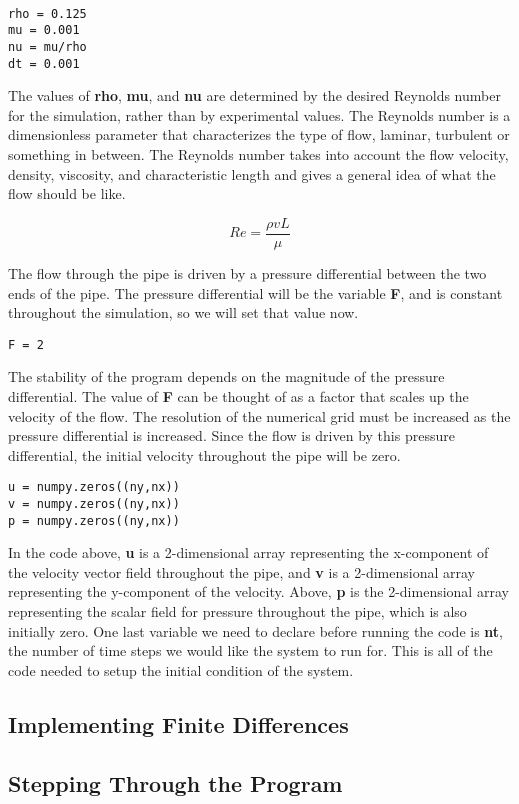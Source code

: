 \documentclass[twocolumn,12pth]{article}
\begin{document}
\begin{lstlisting}

rho = 0.125
mu = 0.001
nu = mu/rho
dt = 0.001

\end{lstlisting}

The values of \textbf{rho}, \textbf{mu}, and \textbf{nu} are determined by the desired Reynolds number for the simulation, rather than by experimental values.
The Reynolds number is a dimensionless parameter that characterizes the type of flow, laminar, turbulent or something in between.
The Reynolds number takes into account the flow velocity, density, viscosity, and characteristic length and gives a general idea of what the flow should be like.

\begin{equation}
Re = \frac{\rho{v}{L}}{\mu}
\end{equation}

The flow through the pipe is driven by a pressure differential between the two ends of the pipe.
The pressure differential will be the variable \textbf{F}, and is constant throughout the simulation, so we will set that value now.

\begin{lstlisting}
F = 2
\end{lstlisting}

The stability of the program depends on the magnitude of the pressure differential.
The value of \textbf{F} can be thought of as a factor that scales up the velocity of the flow.
The resolution of the numerical grid must be increased as the pressure differential is increased.
Since the flow is driven by this pressure differential, the initial velocity throughout the pipe will be zero.

\begin{lstlisting}
u = numpy.zeros((ny,nx))
v = numpy.zeros((ny,nx))
p = numpy.zeros((ny,nx))
\end{lstlisting}

In the code above, \textbf{u} is a 2-dimensional array representing the x-component of the velocity vector field throughout the pipe, and \textbf{v} is a 2-dimensional array representing the y-component of the velocity.
Above, \textbf{p} is the 2-dimensional array representing the scalar field for pressure throughout the pipe, which is also initially zero.
One last variable we need to declare before running the code is \textbf{nt}, the number of time steps we would like the system to run for.
This is all of the code needed to setup the initial condition of the system.

\subsection{Implementing Finite Differences}

\subsection{Stepping Through the Program}
\end{document}
